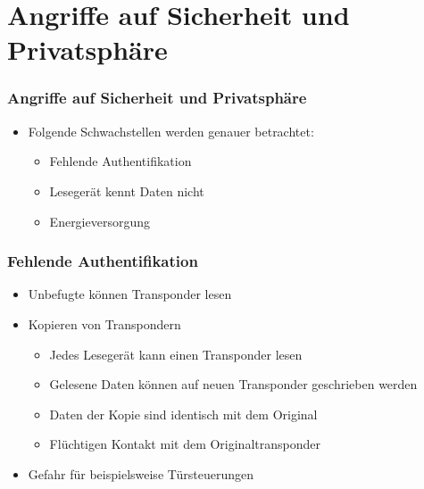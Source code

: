 \documentclass{beamer}
\begin{document}
\section{Angriffe auf Sicherheit und Privatsphäre}
\begin{frame}
\frametitle{Angriffe auf Sicherheit und Privatsphäre}

\begin{itemize}
	\item Folgende Schwachstellen werden genauer betrachtet:
	\begin{itemize}
		\item Fehlende Authentifikation
		\item Lesegerät kennt Daten nicht
		\item Energieversorgung
	\end{itemize}
\end{itemize}
\end{frame}


\begin{frame}
\frametitle{Fehlende Authentifikation}

\begin{itemize}
	\item Unbefugte können Transponder lesen
	\item Kopieren von Transpondern
	\begin{itemize}
		\item Jedes Lesegerät kann einen Transponder lesen
		\item Gelesene Daten können auf neuen Transponder geschrieben werden
		\item Daten der Kopie sind identisch mit dem Original
		\item Flüchtigen Kontakt mit dem Originaltransponder 
	\end{itemize}
	\item Gefahr für beispielsweise Türsteuerungen
\end{itemize}
\end{frame}
\end{document}

